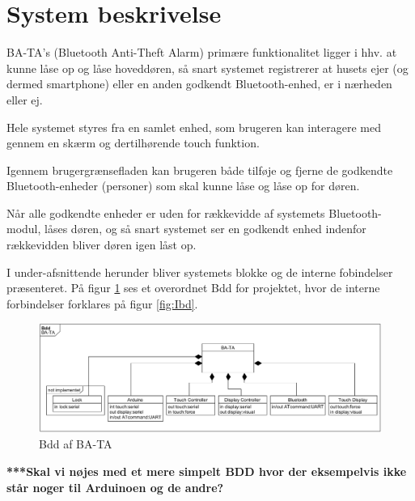 \graphicspath{{Chapters/System/}}


\section{System beskrivelse}

BA-TA's (Bluetooth Anti-Theft Alarm) primære funktionalitet ligger i hhv. at kunne låse op og låse hoveddøren, så snart systemet registrerer at husets ejer (og dermed smartphone) eller en anden godkendt Bluetooth-enhed, er i nærheden eller ej.

Hele systemet styres fra en samlet enhed, som brugeren kan interagere med gennem en skærm og dertilhørende touch funktion. 

Igennem brugergrænsefladen kan brugeren både tilføje og fjerne de godkendte Bluetooth-enheder (personer) som skal kunne låse og låse op for døren.

Når alle godkendte enheder er uden for rækkevidde af systemets Bluetooth-modul, låses døren, og så snart systemet ser en godkendt enhed indenfor rækkevidden bliver døren igen låst op. 

I under-afsnittende herunder bliver systemets blokke og de interne fobindelser præsenteret.
På figur \ref{fig:Bdd} ses et overordnet Bdd for projektet, hvor de interne forbindelser forklares på figur \ref{fig:Ibd}. 

\begin{figure}[H]
	\centering
	\includegraphics[width = 500 pt]{Img/Bdd.png}
	\caption{Bdd af BA-TA}
	\label{fig:Bdd}
\end{figure}

\textbf{***Skal vi nøjes med et mere simpelt BDD hvor der eksempelvis ikke står noger til Arduinoen og de andre?}

